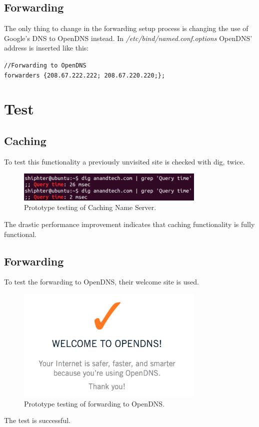 \subsection{Forwarding}
The only thing to change in the forwarding setup process is changing the use of Google's DNS to OpenDNS instead. In \emph{/etc/bind/named.conf.options} OpenDNS' address is inserted like this:

\texttt{//Forwarding to OpenDNS} \\
\texttt{forwarders \{208.67.222.222; 208.67.220.220;\};}

\section{Test}
\subsection{Caching}
To test this functionality a previously unvisited site is checked with dig, twice.

\begin{figure}[ht!]
\centering
\includegraphics[width=90mm]{img/prototype_caching_test.png}
\caption{Prototype testing of Caching Name Server.}
\label{prototype_caching_test}
\end{figure}

The drastic performance improvement indicates that caching functionality is fully functional.

\subsection{Forwarding}
To test the forwarding to OpenDNS, their welcome site is used. 

\begin{figure}[ht!]
\centering
\includegraphics[width=90mm]{img/prototype_forwarding_test.png}
\caption{Prototype testing of forwarding to OpenDNS.}
\label{prototype_forwarding_test}
\end{figure}

The test is successful.
